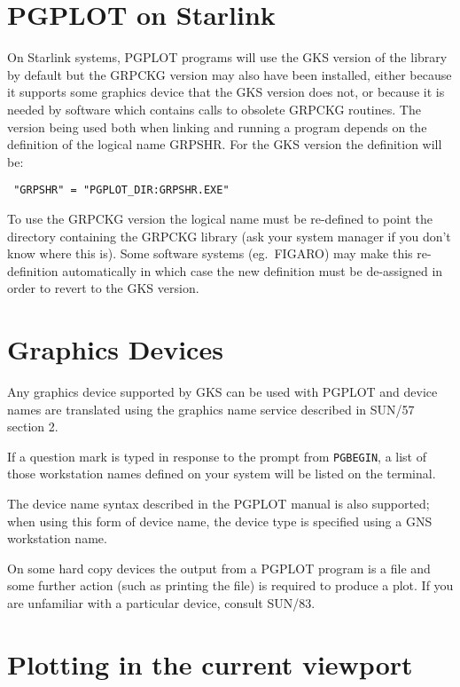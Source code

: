 \section{PGPLOT on Starlink}

On Starlink systems, PGPLOT programs will use the GKS version of the library by
default but the GRPCKG version may also have been installed, either because it
supports some graphics device that the GKS version does not, or because it is
needed by software which contains calls to obsolete GRPCKG routines. The
version being used both when linking and running a program depends on the
definition of the logical name GRPSHR. For the GKS version the definition
will be:
\begin{center}\tt
"GRPSHR" = "PGPLOT_DIR:GRPSHR.EXE"
\end{center}
To use the GRPCKG version the logical name must be re-defined to point the
directory containing the GRPCKG library (ask your system manager if you
don't know where this is). Some software systems (eg.\
FIGARO) may make this re-definition automatically in which case the new
definition must be de-assigned in order to revert to the GKS version.

\section{Graphics Devices}\label{Graphics_Devices}

Any graphics device supported by GKS can be used with PGPLOT and device
names are translated using the graphics name service described in SUN/57
section 2.

If a question mark is typed in response to the prompt from {\tt PGBEGIN}, a
list of those workstation names defined on your system will be listed on the
terminal. 

The device name syntax described in the PGPLOT manual is also
supported; when using this form of device name, the device type is specified
using a GNS workstation name.

On some hard copy devices the output from a PGPLOT program is a file and
some further action (such as printing the file) is required to produce a plot.
If you are unfamiliar with a particular device, consult SUN/83.

\section{Plotting in the current viewport}\label{viewport}

